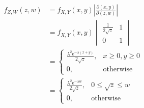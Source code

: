 \documentclass[8pt]{article}
\theoremstyle{compact}
\def\le{\leqslant}
\def\ge{\geqslant}
\def\P#1{\mathbb{P}\left({#1}\right)}
\def\e{\mathrm{e}}
\begin{document}
\iffalse
\begin{equation}
	\begin{split}
		F_{Z, W}(z, w) &= \P{X^2 \le z, X + Y \le w} \\
		&= \int_{0}^{w} \int_{0}^{\min(w - y, \sqrt z)} f_{X, Y}(x, y) \text dx \text dy\\
		&= \int_{0}^{w} \int_{0}^{\min(w - y, \sqrt z)} \lambda^2\e^{-\lambda(x + y)} \text dx \text dy\\
		&= \begin{cases}
			\int_{0}^{w} \int_{0}^{w - y} \lambda^2\e^{-\lambda(x + y)} \text dx \text dy, & \sqrt z > w\\
			\P{X \le \sqrt z}\P{Y \le w - \sqrt z} + \int_{w - \sqrt z}^{w} \int_{0}^{w - y} \lambda^2\e^{-\lambda(x + y)} \text dx \text dy, & \sqrt z \le w
		\end{cases} \\
		&= \begin{cases}
			1 - w\lambda\e^{-\lambda w} - \e^{-\lambda w}, & \sqrt z > w\\
			1 - \sqrt z\lambda\e^{-\lambda w} - \e^{-\lambda \sqrt z}, & \sqrt z \le w
		\end{cases}\\
		f_{Z, W}(z, w) &= \frac{\partial^2 F_{Z, W}(z, w)}{\partial z \partial w} = \begin{cases}
			0, & \sqrt z > w\\
			\frac{\lambda^2\e^{-\lambda w}}{2\sqrt z}, & \sqrt z \le w
		\end{cases}
	\end{split}
\end{equation}
\fi
\begin{equation}
	\begin{split}
		f_{Z, W}(z, w) &= f_{X, Y}(x, y)\left|\frac{\partial(x, y)}{\partial(z, w)}\right|\\
		&= f_{X, Y}(x, y) \begin{vmatrix}
			\frac{1}{2\sqrt z} & 1 \\ 0 & 1
		\end{vmatrix}\\
		&= \begin{cases}
			\frac{\lambda^2\e^{-\lambda(x + y)}}{2\sqrt z}, & x \ge 0, y \ge 0\\
			0, & \text{otherwise}
		\end{cases}\\
		&= \begin{cases}
			\frac{\lambda^2\e^{-\lambda w}}{2\sqrt z}, & 0 \le \sqrt z \le w\\
			0, & \text{otherwise}
		\end{cases}
	\end{split}
\end{equation}
\end{document}
